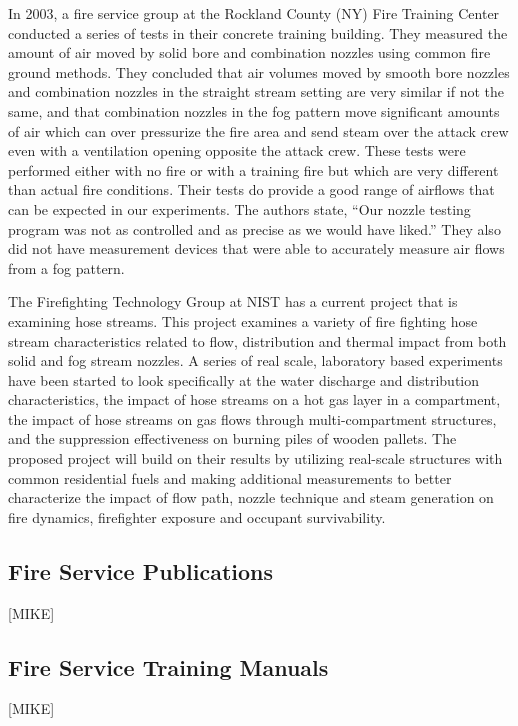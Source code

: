\documentclass{article}
\begin{document}
In 2003, a fire service group at the Rockland County (NY) Fire Training Center conducted a series of tests in their concrete training building. They measured the amount of air moved by solid bore and combination nozzles using common fire ground methods. They concluded that air volumes moved by smooth bore nozzles and combination nozzles in the straight stream setting are very similar if not the same, and that combination nozzles in the fog pattern move significant amounts of air which can over pressurize the fire area and send steam over the attack crew even with a ventilation opening opposite the attack crew. These tests were performed either with no fire or with a training fire but which are very different than actual fire conditions. Their tests do provide a good range of airflows that can be expected in our experiments. The authors state, “Our nozzle testing program was not as controlled and as precise as we would have liked.” They also did not have measurement devices that were able to accurately measure air flows from a fog pattern.  

The Firefighting Technology Group at NIST has a current project that is examining hose streams. This project examines a variety of fire fighting hose stream characteristics related to flow, distribution and thermal impact from both solid and fog stream nozzles. A series of real scale, laboratory based experiments have been started to look specifically at the water discharge and distribution characteristics, the impact of hose streams on a hot gas layer in a compartment, the impact of hose streams on gas flows through multi-compartment structures, and the suppression effectiveness on burning piles of wooden pallets. The proposed project will build on their results by utilizing real-scale structures with common residential fuels and making additional measurements to better characterize the impact of flow path, nozzle technique and steam generation on fire dynamics, firefighter exposure and occupant survivability.

\subsection{Fire Service Publications}

[MIKE]

\subsection{Fire Service Training Manuals}

[MIKE]
\end{document}
